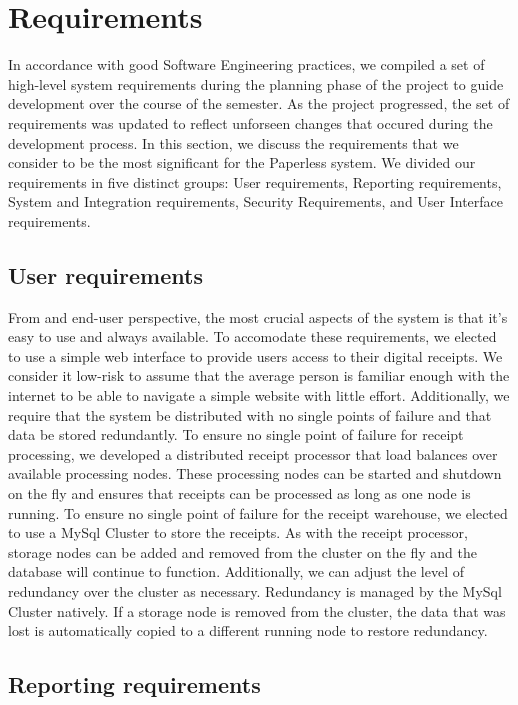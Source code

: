 \section{Requirements}
In accordance with good Software Engineering practices, we compiled a set of high-level system requirements during the planning phase of the project to guide development over the course of the semester.  As the project progressed, the set of requirements was updated to reflect unforseen changes that occured during the development process.  In this section, we discuss the requirements that we consider to be the most significant for the Paperless system.  We divided our requirements in five distinct groups: User requirements, Reporting requirements, System and Integration requirements, Security Requirements, and User Interface requirements.

\subsection{User requirements}
\label{sec:requirements.user}

From and end-user perspective, the most crucial aspects of the system is that it's easy to use and always available.  To accomodate these requirements, we elected to use a simple web interface to provide users access to their digital receipts.  We consider it low-risk to assume that the average person is familiar enough with the internet to be able to navigate a simple website with little effort.  Additionally, we require that the system be distributed with no single points of failure and that data be stored redundantly.  To ensure no single point of failure for receipt processing, we developed a distributed receipt processor that load balances over available processing nodes.  These processing nodes can be started and shutdown on the fly and ensures that receipts can be processed as long as one node is running.  To ensure no single point of failure for the receipt warehouse, we elected to use a MySql Cluster to store the receipts.  As with the receipt processor, storage nodes can be added and removed from the cluster on the fly and the database will continue to function.  Additionally, we can adjust the level of redundancy over the cluster as necessary.  Redundancy is managed by the MySql Cluster natively.  If a storage node is removed from the cluster, the data that was lost is automatically copied to a different running node to restore redundancy.

\subsection{Reporting requirements}
\label{sec:requirements.reporting}

